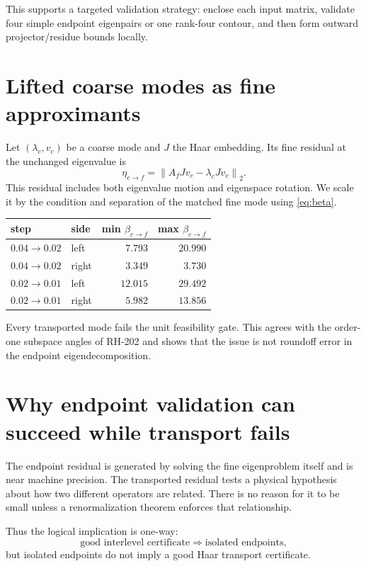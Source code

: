 \documentclass[12pt]{article}
\theoremstyle{remark}\newtheorem{remark}[theorem]{Remark}
\newcommand{\norm}[1]{\left\lVert#1\right\rVert}
\begin{document}
This supports a targeted validation strategy: enclose each input matrix,
validate four simple endpoint eigenpairs or one rank-four contour, and then
form outward projector/residue bounds locally.

\section{Lifted coarse modes as fine approximants}

Let $(\lambda_c,v_c)$ be a coarse mode and $J$ the Haar embedding.  Its fine
residual at the unchanged eigenvalue is
\begin{equation}\label{eq:lifted-residual}
 \eta_{c\to f}=\norm{A_fJv_c-\lambda_cJv_c}_2.
\end{equation}
This residual includes both eigenvalue motion and eigenspace rotation.  We
scale it by the condition and separation of the matched fine mode using
\eqref{eq:beta}.

\begin{center}
\begin{tabular}{llrr}
\toprule
step & side & min $\beta_{c\to f}$ & max $\beta_{c\to f}$\\
\midrule
$0.04\to0.02$ & left  & $7.793$ & $20.990$\\
$0.04\to0.02$ & right & $3.349$ & $3.730$\\
$0.02\to0.01$ & left  & $12.015$ & $29.492$\\
$0.02\to0.01$ & right & $5.982$ & $13.856$\\
\bottomrule
\end{tabular}
\end{center}
Every transported mode fails the unit feasibility gate.  This agrees with
the order-one subspace angles of RH-202 and shows that the issue is not
roundoff error in the endpoint eigendecomposition.

\section{Why endpoint validation can succeed while transport fails}

The endpoint residual is generated by solving the fine eigenproblem itself
and is near machine precision.  The transported residual tests a physical
hypothesis about how two different operators are related.  There is no
reason for it to be small unless a renormalization theorem enforces that
relationship.

Thus the logical implication is one-way:
\begin{equation*}
 \text{good interlevel certificate}
 \Longrightarrow \text{isolated endpoints},
\end{equation*}
but isolated endpoints do not imply a good Haar transport certificate.
\end{document}
